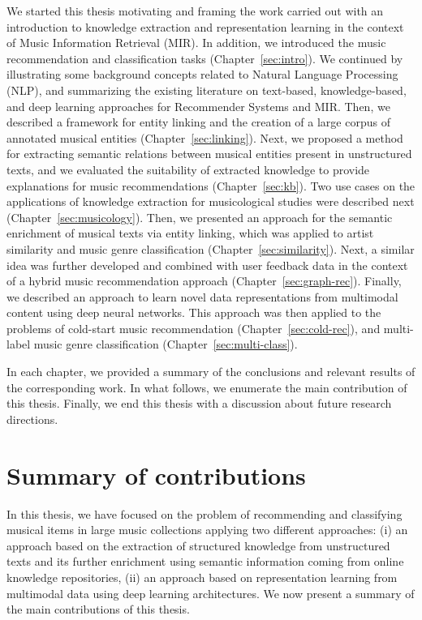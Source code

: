 We started this thesis motivating and framing the work carried out with an introduction to knowledge extraction and representation learning in the context of Music Information Retrieval (MIR). In addition, we introduced the music recommendation and classification tasks (Chapter~\ref{sec:intro}). We continued by illustrating some background concepts related to Natural Language Processing (NLP), and summarizing the existing literature on text-based, knowledge-based, and deep learning approaches for Recommender Systems and MIR. Then, we described a framework for entity linking and the creation of a large corpus of annotated musical entities (Chapter~\ref{sec:linking}). Next, we proposed a method for extracting semantic relations between musical entities present in unstructured texts, and we evaluated the suitability of extracted knowledge to provide explanations for music recommendations (Chapter~\ref{sec:kb}). Two use cases on the applications of knowledge extraction for musicological studies were described next (Chapter~\ref{sec:musicology}). Then, we presented an approach for the semantic enrichment of musical texts via entity linking, which was applied to artist similarity and music genre classification (Chapter~\ref{sec:similarity}). Next, a similar idea was further developed and combined with user feedback data in the context of a hybrid music recommendation approach (Chapter~\ref{sec:graph-rec}). Finally, we described an approach to learn novel data representations from multimodal content using deep neural networks. This approach was then applied to the problems of cold-start music recommendation (Chapter~\ref{sec:cold-rec}), and multi-label music genre classification (Chapter~\ref{sec:multi-class}).

In each chapter, we provided a summary of the conclusions and relevant results of the corresponding work. In what follows, we enumerate the main contribution of this thesis. Finally, we end this thesis with a discussion about future research directions.

\section{Summary of contributions}
\label{sec:conclusion:summary}

In this thesis, we have focused on the problem of recommending and classifying musical items in large music collections applying two different approaches: (i) an approach based on the extraction of structured knowledge from unstructured texts and its further enrichment using semantic information coming from online knowledge repositories, (ii) an approach based on representation learning from multimodal data using deep learning architectures. We now present a summary of the main contributions of this thesis.

